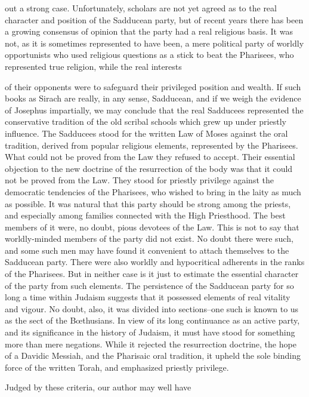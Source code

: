 out a strong case. Unfortunately, scholars are not yet agreed as to the real character and position of the Sadducean party, but of recent years there has been a growing consensus of opinion that the party had a real religious basis. It was not, as it is sometimes represented to have been, a mere political party of worldly opportunists who used religious questions as a stick to beat the Pharisees, who represented true religion, while the real interests

of their opponents were to safeguard their privileged position and wealth. If such books as Sirach are really, in any sense, Sadducean, and if we weigh the evidence of Josephus impartially, we may conclude that the real Sadducees represented the conservative tradition of the old scribal schools which grew up under priestly influence. The Sadducees stood for the written Law of Moses against the oral tradition, derived from popular religious elements, represented by the Pharisees. What could not be proved from the Law they refused to accept. Their essential objection to the new doctrine of the resurrection of the body was that it could not be proved from the Law. They stood for priestly privilege against the democratic tendencies of the Pharisees, who wished to bring in the laity as much as possible. It was natural that this party should be strong among the priests, and especially among families connected with the High Priesthood. The best members of it were, no doubt, pious devotees of the Law. This is not to say that worldly-minded members of the party did not exist. No doubt there were such, and some such men may have found it convenient to attach themselves to the Sadducean party. There were also worldly and hypocritical adherents in the ranks of the Pharisees. But in neither case is it just to estimate the essential character of the party from such elements. The persistence of the Sadducean party for so long a time within Judaism suggests that it possessed elements of real vitality and vigour. No doubt, also, it was divided into sections--one such is known to us as the sect of the Bœthusians. In view of its long continuance as an active party, and its significance in the history of Judaism, it must have stood for something more than mere negations. While it rejected the resurrection doctrine, the hope of a Davidic Messiah, and the Pharisaic oral tradition, it upheld the sole binding force of the written Torah, and emphasized priestly privilege.

Judged by these criteria, our author may well have

